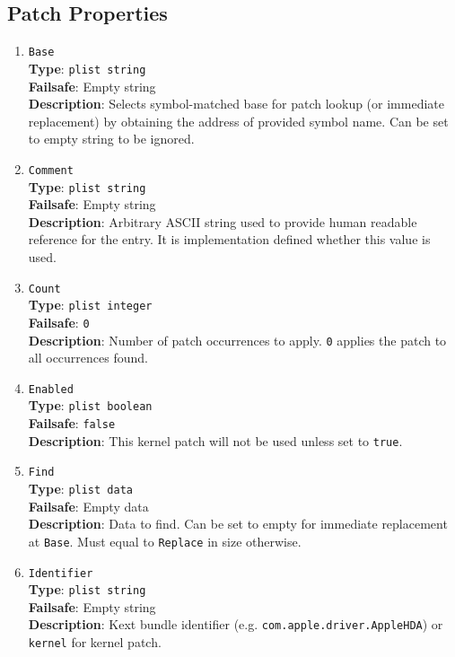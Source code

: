 \documentclass[]{article}
\makeatletter
\renewcommand{\label}[1]{%
\zref@wrapper@immediate{\oldlabel{#1}}}  %
\makeatother
\begin{document}
\subsection{Patch Properties}\label{kernelpropspatch}

\begin{enumerate}
\item
  \texttt{Base}\\
  \textbf{Type}: \texttt{plist\ string}\\
  \textbf{Failsafe}: Empty string\\
  \textbf{Description}: Selects symbol-matched base for patch lookup (or immediate
  replacement) by obtaining the address of provided symbol name. Can be set to
  empty string to be ignored.

\item
  \texttt{Comment}\\
  \textbf{Type}: \texttt{plist\ string}\\
  \textbf{Failsafe}: Empty string\\
  \textbf{Description}: Arbitrary ASCII string used to provide human readable
  reference for the entry. It is implementation defined whether this value is
  used.

\item
  \texttt{Count}\\
  \textbf{Type}: \texttt{plist\ integer}\\
  \textbf{Failsafe}: \texttt{0}\\
  \textbf{Description}: Number of patch occurrences to apply. \texttt{0} applies
  the patch to all occurrences found.

\item
  \texttt{Enabled}\\
  \textbf{Type}: \texttt{plist\ boolean}\\
  \textbf{Failsafe}: \texttt{false}\\
  \textbf{Description}: This kernel patch will not be used unless set to
  \texttt{true}.

\item
  \texttt{Find}\\
  \textbf{Type}: \texttt{plist\ data}\\
  \textbf{Failsafe}: Empty data\\
  \textbf{Description}: Data to find. Can be set to empty for immediate
  replacement at \texttt{Base}. Must equal to \texttt{Replace} in size
  otherwise.

\item
  \texttt{Identifier}\\
  \textbf{Type}: \texttt{plist\ string}\\
  \textbf{Failsafe}: Empty string\\
  \textbf{Description}: Kext bundle identifier (e.g. \texttt{com.apple.driver.AppleHDA})
  or \texttt{kernel} for kernel patch.


\end{enumerate}
\end{document}
